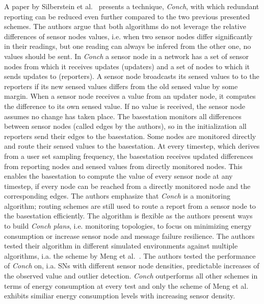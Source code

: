 A paper by Silberstein et al.~\cite{silberstein2006constraint} presents a
technique, \textit{Conch}, with which redundant reporting can be reduced even
further compared to the two previous presented schemes. The authors argue that
both algorithms do not leverage the relative differences of sensor nodes
values, i.e. when two sensor nodes differ significantly in their readings, but
one reading can always be infered from the other one, no values should be sent.
In \textit{Conch} a sensor node in a network has a set of sensor nodes from
which it receives updates (updaters) and a set of nodes to which it sends
updates to (reporters). A sensor node broadcasts its sensed values to to the
reporters if its new sensed values differs from the old sensed value by some
margin. When a sensor node receives a value from an updater node, it computes
the difference to its own sensed value. If no value is received, the sensor
node assumes no change has taken place. The basestation monitors all
differences between sensor nodes (called edges by the authors), so in the
initialization all reporters send their edges to the basestation. Some nodes
are monitored directly and route their sensed values to the basestation. At
every timestep, which derives from a user set sampling frequency, the
basestation receives updated differences from reporting nodes and sensed values
from directly monitored nodes. This enables the basestation to compute the
value of every sensor node at any timestep, if every node can be reached from a
directly monitored node and the corresponding edges. The authors emphasize that
\textit{Conch} is a monitoring algorithm; routing schemes are still used to
route a report from a sensor node to the basestation efficiently. The algorithm
is flexible as the authors present ways to build \textit{Conch plans}, i.e.
monitoring topologies, to focus on minimizing energy consumption or increase
sensor node and message failure resilience. The authors tested their algorithm
in different simulated environments against multiple algorithms, i.a. the
scheme by Meng et al.~\cite{meng2004event}. The authors tested the performance
of \textit{Conch} on, i.a. \acp{SN} with different sensor node densities,
predictable increases of the observed value and outlier detection.
\textit{Conch} outperforms all other schemes in terms of energy consumption at
every test and only the scheme of Meng et al. exhibits similiar energy
consumption levels with increasing sensor density.



